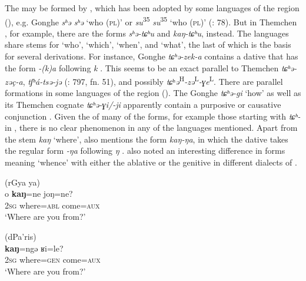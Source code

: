 The  may be formed by , which has been adopted by some  languages of the region (), e.g. Gonghe  \textit{sʰ}\textit{ə sʰ}\textit{ə} ‘who (\textsc{pl})’ \citep[54]{Ebihara2011} or  \textit{su}\textsuperscript{35} \textit{su}\textsuperscript{35} ‘who (\textsc{pl})’ (\citealt{Sun1996}: 78). But in Themchen , for example, there are the  forms \textit{sʰ}\textit{ə-tɕ}\textit{ʰ}\textit{u} and \textit{kaŋ-tɕʰ}\textit{u}, instead. The languages share stems for ‘who’, ‘which’, ‘when’, and ‘what’, the last of which is the basis for several derivations. For instance, Gonghe  \textit{tɕʰ}\textit{ə-zek-a} contains a dative  that has the form \textit{-(k)a} following \textit{k} \citep[60]{Ebihara2011}. This seems to be an exact parallel to Themchen \textit{tɕʰ}\textit{ə-zəç-a},  \textit{tʃʰ}\textit{á-tsə-jə} (\citealt{Sun2003a}: 797, fn. 51), and possibly  \textit{tɕ}ʰ\textit{ə}\textsuperscript{H}\textit{-}\textit{zə}\textsuperscript{L}\textit{-}\textit{ɣe}\textsuperscript{L}. There are parallel formations in some  languages of the region (). The Gonghe  \textit{tɕʰ}\textit{ə-gi} ‘how’ as well as its Themchen cognate \textit{tɕʰ}\textit{ə-ɣi/-ji} apparently contain a purposive or causative conjunction \citep[71]{Ebihara2011}. Given the  of many of the forms, for example those starting with \textit{tɕʰ}\textit{-} in , there is no clear  phenomenon in any of the languages mentioned. Apart from the stem \textit{kaŋ} ‘where’, \citet[165]{Ebihara2009} also mentions the form \textit{kaŋ-ŋa}, in which the dative takes the regular form \textit{-ŋa} following \textit{ŋ} \citep[60]{Ebihara2011}. \citet[157]{Ebihara2013} also noted an interesting difference in forms meaning ‘whence’ with either the ablative or the genitive in different dialects of .

\ea%
    \label{ex:trans:50}
     (rGya ya)\\
    o \textbf{{kaŋ}}=ne  joŋ=ne?\\
    2\textsc{sg}  where=\textsc{abl}  come=\textsc{aux}\\
    \glt ‘Where are you from?’
    \z

\ea%
    \label{ex:trans:51}
     (dPa’ris)\\
     \textbf{{kaŋ}}=ngə  ʁi=le?\\
    2\textsc{sg}  where=\textsc{gen}  come=\textsc{aux}\\
    \glt ‘Where are you from?’ \citep[157]{Ebihara2013}
    \z

